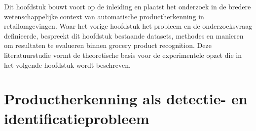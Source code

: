 




Dit hoofdstuk bouwt voort op de inleiding en plaatst het onderzoek in de bredere wetenschappelijke context van automatische productherkenning in retailomgevingen. Waar het vorige hoofdstuk het probleem en de onderzoeksvraag definieerde, bespreekt dit hoofdstuk bestaande datasets, methodes en manieren om resultaten te evalueren binnen grocery product recognition. Deze literatuurstudie vormt de theoretische basis voor de experimentele opzet die in het volgende hoofdstuk wordt beschreven.

\section{Productherkenning als detectie- en identificatieprobleem}

